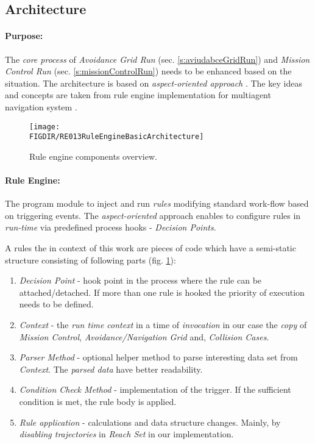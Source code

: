 \subsection{Architecture}\label{s:RuleEngineArchitecture}

\paragraph{Purpose:} The \emph{core process} of \emph{Avoidance Grid Run} (sec. \ref{s:aviudabceGridRun}) and \emph{Mission Control Run} (sec. \ref{s:missionControlRun}) needs to be enhanced based on  the situation. The architecture is based on \emph{aspect-oriented approach} \cite{hill2003jess}. The key ideas and concepts are taken from rule engine implementation for multiagent  navigation system \cite{seyboth2013event}.

\begin{figure}[H]
    \centering
    \texttt{[image: \\FIGDIR/RE013RuleEngineBasicArchitecture]}
    \caption{Rule engine components overview.}
    \label{fig:RuleEngineBasicArchitecture}
\end{figure}

\paragraph{Rule Engine:} The program module to inject and run \emph{rules} modifying standard work-flow based on  triggering events. The \emph{aspect-oriented} approach enables to configure rules in \emph{run-time} via predefined process hooks - \emph{Decision Points}. 

\noindent A rules the in context of this work are pieces of code which have a semi-static structure consisting of following parts (fig. \ref{fig:RuleEngineBasicArchitecture}):

\begin{enumerate}
    \item \emph{Decision Point} - hook point in the process where the rule can be attached/detached. If more than one rule is hooked the priority of execution needs to be defined. 
    
    \item \emph{Context} - the \emph{run time context} in a time of \emph{invocation} in our case the \emph{copy} of \emph{Mission Control}, \emph{Avoidance/Navigation Grid} and,  \emph{Collision Cases}.
    
    \item \emph{Parser Method} - optional helper method to parse interesting data set from \emph{Context}. The \emph{parsed data} have better readability.
    
    \item \emph{Condition Check Method} - implementation of the trigger. If the sufficient condition is met, the rule body is applied.
    
    \item \emph{Rule application} - calculations and data structure changes. Mainly, by  \emph{disabling trajectories} in \emph{Reach Set} in our implementation.     
\end{enumerate}

